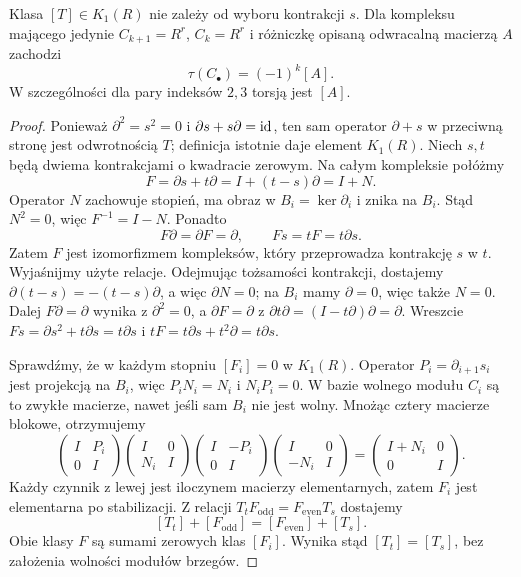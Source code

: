 \begin{stwierdzenie}
\label{prop:torsja-poprawna-20}
Klasa $[T]\in K_1(R)$ nie zależy od wyboru
kontrakcji $s$. Dla kompleksu mającego jedynie
$C_{k+1}=R^r$, $C_k=R^r$ i różniczkę opisaną
odwracalną macierzą $A$ zachodzi
\begin{equation}\label{eq:torsja-dwa-stopnie-20}
 \tau(C_\bullet)=(-1)^k[A].
\end{equation}
W szczególności dla pary indeksów $2,3$ torsją
jest $[A]$.
\end{stwierdzenie}
\begin{proof}
Ponieważ $\partial^2=s^2=0$ i
$\partial s+s\partial=\mathrm{id}$, ten sam operator
$\partial+s$ w przeciwną stronę jest odwrotnością
$T$; definicja istotnie daje element $K_1(R)$.
Niech $s,t$ będą dwiema kontrakcjami o kwadracie zerowym.
Na całym kompleksie połóżmy
\[
 F=\partial s+t\partial=I+(t-s)\partial=I+N.
\]
Operator $N$ zachowuje stopień, ma obraz w
$B_i=\ker\partial_i$ i znika na $B_i$. Stąd $N^2=0$,
więc $F^{-1}=I-N$. Ponadto
\[
 F\partial=\partial F=\partial,
 \qquad Fs=tF=t\partial s.
\]
Zatem $F$ jest izomorfizmem kompleksów, który przeprowadza
kontrakcję $s$ w $t$.
Wyjaśnijmy użyte relacje. Odejmując tożsamości kontrakcji,
dostajemy $\partial(t-s)=-(t-s)\partial$, a więc
$\partial N=0$; na $B_i$ mamy $\partial=0$, więc także $N=0$.
Dalej $F\partial=\partial$ wynika z $\partial^2=0$,
a $\partial F=\partial$ z
$\partial t\partial=(I-t\partial)\partial=\partial$.
Wreszcie $Fs=\partial s^2+t\partial s=t\partial s$
i $tF=t\partial s+t^2\partial=t\partial s$.

Sprawdźmy, że w każdym stopniu $[F_i]=0$ w $K_1(R)$.
Operator $P_i=\partial_{i+1}s_i$ jest projekcją na $B_i$,
więc $P_iN_i=N_i$ i $N_iP_i=0$. W bazie wolnego modułu
$C_i$ są to zwykłe macierze, nawet jeśli sam $B_i$ nie jest wolny.
Mnożąc cztery macierze blokowe, otrzymujemy
\[
 \begin{pmatrix}I&P_i\\0&I\end{pmatrix}
 \begin{pmatrix}I&0\\N_i&I\end{pmatrix}
 \begin{pmatrix}I&-P_i\\0&I\end{pmatrix}
 \begin{pmatrix}I&0\\-N_i&I\end{pmatrix}
 =\begin{pmatrix}I+N_i&0\\0&I\end{pmatrix}.
\]
Każdy czynnik z lewej jest iloczynem macierzy elementarnych,
zatem $F_i$ jest elementarna po stabilizacji.
Z relacji $T_tF_{\mathrm{odd}}=F_{\mathrm{even}}T_s$ dostajemy
\[
 [T_t]+[F_{\mathrm{odd}}]=[F_{\mathrm{even}}]+[T_s].
\]
Obie klasy $F$ są sumami zerowych klas $[F_i]$.
Wynika stąd $[T_t]=[T_s]$, bez założenia wolności modułów brzegów.


\end{proof}
